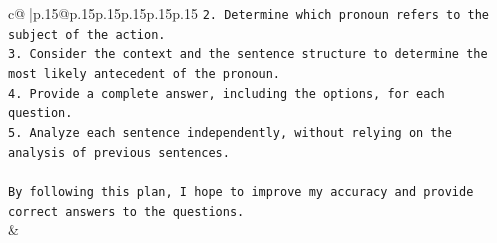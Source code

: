 \documentclass{article}
\begin{document}
{\begin{supertabular}{c@{$\;$}|p{.15\linewidth}@{}p{.15\linewidth}p{.15\linewidth}p{.15\linewidth}p{.15\linewidth}p{.15\linewidth}}
{{{\texttt{2. Determine which pronoun refers to the subject of the action.} \\
\texttt{3. Consider the context and the sentence structure to determine the most likely antecedent of the pronoun.} \\
\texttt{4. Provide a complete answer, including the options, for each question.} \\
\texttt{5. Analyze each sentence independently, without relying on the analysis of previous sentences.} \\
\\ 
\texttt{By following this plan, I hope to improve my accuracy and provide correct answers to the questions.} \\
            }
        }
    }
    & \\ \\

\end{supertabular}
}
\end{document}
